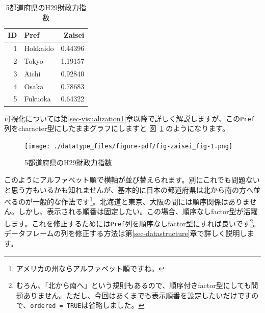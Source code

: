 \documentclass[
  a4paper,
  pandoc,
  ja=standard,
  jafont=haranoaji]{bxjsbook}
\newenvironment{Shaded}{\begin{snugshade}}{\end{snugshade}}
\newcommand{\AttributeTok}[1]{\textcolor[rgb]{0.00,0.48,0.65}{#1}}
\newcommand{\FunctionTok}[1]{\textcolor[rgb]{0.28,0.35,0.67}{#1}}
\newcommand{\NormalTok}[1]{\textcolor[rgb]{0.00,0.48,0.65}{#1}}
\newcommand{\OtherTok}[1]{\textcolor[rgb]{0.00,0.48,0.65}{#1}}
\newcommand{\SpecialCharTok}[1]{\textcolor[rgb]{0.37,0.37,0.37}{#1}}
\newcommand{\StringTok}[1]{\textcolor[rgb]{0.13,0.47,0.30}{#1}}
\begin{document}
\hypertarget{tbl-zaisei}{}
\begin{table}
\caption{\label{tbl-zaisei}5都道府県のH29財政力指数 }

\centering
\begin{tabular}{r|l|r}
\hline
ID & Pref & Zaisei\\
\hline
1 & Hokkaido & 0.44396\\
\hline
2 & Tokyo & 1.19157\\
\hline
3 & Aichi & 0.92840\\
\hline
4 & Osaka & 0.78683\\
\hline
5 & Fukuoka & 0.64322\\
\hline
\end{tabular}
\end{table}

可視化については第\ref{sec-visualization1}章以降で詳しく解説しますが、この\texttt{Pref}列をcharacter型にしたままグラフにしますと
図~\ref{fig-zaisei_fig} のようになります。

\begin{figure}

{\centering \texttt{[image: ./datatype\_files/figure-pdf/fig-zaisei\_fig-1.png]}

}

\caption{\label{fig-zaisei_fig}5都道府県のH29財政力指数}

\end{figure}

このようにアルファベット順で横軸が並び替えられます。別にこれでも問題ないと思う方もいるかも知れませんが、基本的に日本の都道府県は北から南の方へ並べるのが一般的な作法です\footnote{アメリカの州ならアルファベット順ですね。}。北海道と東京、大阪の間には順序関係はありません。しかし、表示される順番は固定したい。この場合、順序なしfactor型が活躍します。これを修正するためには\texttt{Pref}列を順序なしfactor型にすれば良いです\footnote{むろん、「北から南へ」という規則もあるので、順序付きfactor型にしても問題ありません。ただし、今回はあくまでも表示順番を設定したいだけですので、\texttt{ordered\ =\ TRUE}は省略しました。}。データフレームの列を修正する方法は第\ref{sec-datastructure}章で詳しく説明します。

\begin{Shaded}
\end{Shaded}
\end{document}
